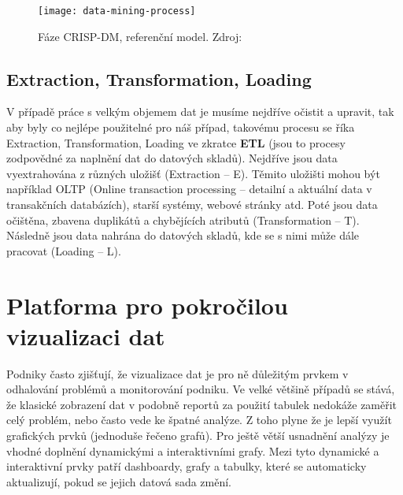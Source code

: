 \begin{figure}[!htp]
\centering
\texttt{[image: data-mining-process]}
\caption[Fáze CRISP-DM, referenční model]{Fáze CRISP-DM, referenční model. Zdroj: \cite{data-mining-practical}}
\label{crisp-dm}
\end{figure}

\subsection{Extraction, Transformation, Loading}
\par V případě práce s velkým objemem dat je musíme nejdříve očistit a upravit, tak aby byly co nejlépe použitelné pro náš případ, takovému procesu se říka Extraction, Transformation, Loading ve zkratce \textbf{ETL} (jsou to procesy zodpovědné za naplnění dat do datových skladů). Nejdříve jsou data vyextrahována z různých uložišť (Extraction -- E). Těmito uložišti mohou být například OLTP (Online transaction processing -- detailní a aktuální data v transakčních databázích), starší systémy, webové stránky atd. Poté jsou data očištěna, zbavena duplikátů a chybějících atributů  (Transformation -- T). Následně jsou data nahrána do datových skladů, kde se s nimi může dále pracovat (Loading -- L).


\section{Platforma pro pokročilou vizualizaci dat}
\par Podniky často zjišťují, že vizualizace dat je pro ně důležitým prvkem v odhalování problémů a monitorování podniku. Ve velké většině případů se stává, že klasické zobrazení dat v podobně reportů za použití tabulek nedokáže zaměřit celý problém, nebo často vede ke špatné analýze. Z toho plyne že je lepší využít grafických prvků (jednoduše řečeno grafů). Pro ještě větší usnadnění analýzy je vhodné doplnění dynamickými a interaktivními grafy. Mezi tyto dynamické a interaktivní prvky patří dashboardy, grafy a tabulky, které se automaticky aktualizují, pokud se jejich datová sada změní.

